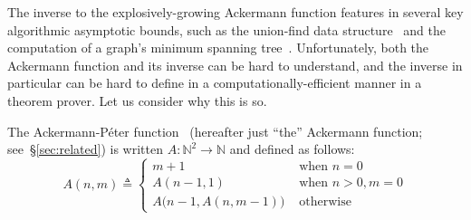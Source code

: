 The inverse to the explosively-growing Ackermann function
features in several key algorithmic asymptotic
bounds, such as the union-find data structure~\cite{tarjan} and
the computation of a graph's minimum spanning
tree~\cite{chazelle}.  Unfortunately, both the Ackermann
function and its inverse
can be hard to understand, and the inverse in particular can be hard to define in a computationally-efficient manner in a theorem prover.  Let us consider why this
is so.
\begin{defn} \label{defn: ack}
The Ackermann-P\'eter function~\cite{peter} (hereafter just
``the'' Ackermann function; see~\S\ref{sec:related}) is
written $A : \mathbb{N}^2 \to \mathbb{N}$ and defined as follows:
\begin{equation}
\label{eq:ackermann}
A(n, m) \triangleq \begin{cases}
m + 1 & \text{ when } n = 0 \\
A(n-1, 1) & \text{ when } n > 0, m = 0 \\
A\big(n-1, A(n, m-1)\big) & \text{ otherwise}
\end{cases}
\end{equation}
\end{defn}

